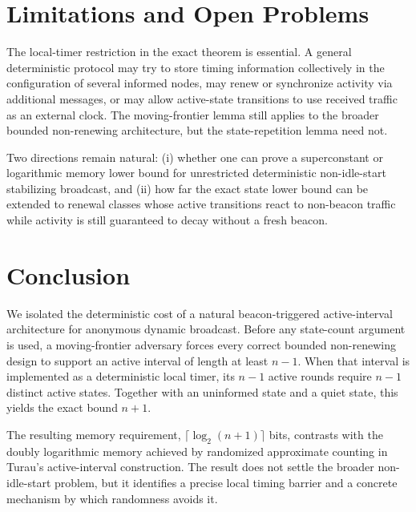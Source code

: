 \documentclass[11pt]{article}
\begin{document}
\section{Limitations and Open Problems}
The local-timer restriction in the exact theorem is essential. A general deterministic protocol may try to store timing information collectively in the configuration of several informed nodes, may renew or synchronize activity via additional messages, or may allow active-state transitions to use received traffic as an external clock. The moving-frontier lemma still applies to the broader bounded non-renewing architecture, but the state-repetition lemma need not.

Two directions remain natural: (i) whether one can prove a superconstant or logarithmic memory lower bound for unrestricted deterministic non-idle-start stabilizing broadcast, and (ii) how far the exact state lower bound can be extended to renewal classes whose active transitions react to non-beacon traffic while activity is still guaranteed to decay without a fresh beacon.

\section{Conclusion}
We isolated the deterministic cost of a natural beacon-triggered active-interval architecture for anonymous dynamic broadcast. Before any state-count argument is used, a moving-frontier adversary forces every correct bounded non-renewing design to support an active interval of length at least $n-1$. When that interval is implemented as a deterministic local timer, its $n-1$ active rounds require $n-1$ distinct active states. Together with an uninformed state and a quiet state, this yields the exact bound $n+1$.

The resulting memory requirement, $\lceil\log_2(n+1)\rceil$ bits, contrasts with the doubly logarithmic memory achieved by randomized approximate counting in Turau's active-interval construction. The result does not settle the broader non-idle-start problem, but it identifies a precise local timing barrier and a concrete mechanism by which randomness avoids it.



\end{document}
